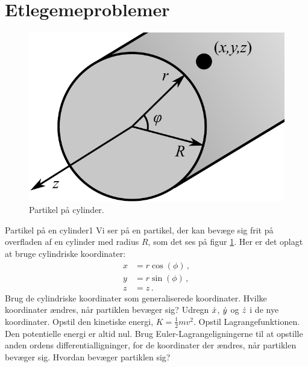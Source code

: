 \section*{Etlegemeproblemer}
%
%
\begin{figure}[h!]
\centering
\includegraphics[width = .72\columnwidth]{Analytisk-Mekanik/cylinderopg_sh.pdf}
\caption{Partikel på cylinder.} \label{cyl-fig}
\end{figure}
%
%
\begin{opgave}{Partikel på en cylinder}{1} \label{opg:Cylinder}
Vi ser på en partikel, der kan bevæge sig frit på overfladen af en cylinder med radius $R$, som det ses på figur \ref{cyl-fig}. Her er det oplagt at bruge cylindriske koordinater:
\begin{align*}
x &= r\cos(\phi) \, , \\
y &= r\sin(\phi) \, , \\
z &= z \, .
\end{align*}
\opg Brug de cylindriske koordinater som generaliserede koordinater. Hvilke koordinater ændres, når partiklen bevæger sig?
\opg Udregn $\dot{x}$, $\dot{y}$ og $\dot{z}$ i de nye koordinater.
\opg Opstil den kinetiske energi, $K=\frac{1}{2}mv^2$.
\opg Opstil Lagrangefunktionen. Den potentielle energi er altid nul.
\opg Brug Euler-Lagrangeligningerne til at opstille anden ordens differentialligninger, for de koordinater der ændres, når partiklen bevæger sig.
\opg Hvordan bevæger partiklen sig?
\end{opgave}
%
%
